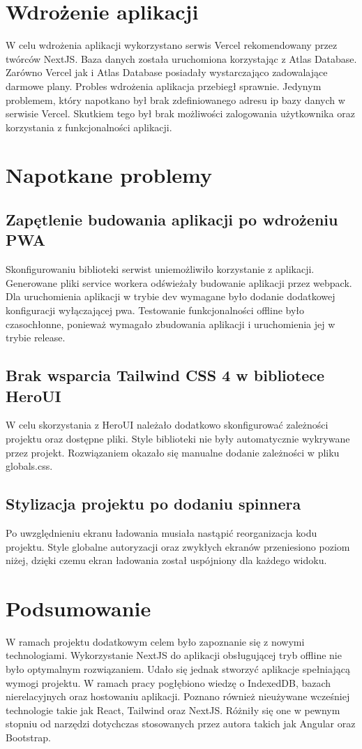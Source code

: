 \documentclass[11pt,titlepage]{article}
\begin{document}
\section{Wdrożenie aplikacji}
W celu wdrożenia aplikacji wykorzystano serwis Vercel rekomendowany przez twórców NextJS. Baza danych została uruchomiona korzystając z Atlas Database. Zarówno Vercel jak i Atlas Database posiadały wystarczająco zadowalające darmowe plany. Probles wdrożenia aplikacja przebiegł sprawnie. Jedynym problemem, który napotkano był brak zdefiniowanego adresu ip bazy danych w serwisie Vercel. Skutkiem tego był brak możliwości zalogowania użytkownika oraz korzystania z funkcjonalności aplikacji.

\section{Napotkane problemy}
\subsection{Zapętlenie budowania aplikacji po wdrożeniu PWA}
Skonfigurowaniu biblioteki serwist uniemożliwiło korzystanie z aplikacji. Generowane pliki service workera odświeżały budowanie aplikacji przez webpack. Dla uruchomienia aplikacji w trybie dev wymagane było dodanie dodatkowej konfiguracji wyłączającej pwa. Testowanie funkcjonalności offline było czasochłonne, ponieważ wymagało zbudowania aplikacji i uruchomienia jej w trybie release.

\subsection{Brak wsparcia Tailwind CSS 4 w bibliotece HeroUI}
W celu skorzystania z HeroUI należało dodatkowo skonfigurować zależności projektu oraz dostępne pliki. Style biblioteki nie były automatycznie wykrywane przez projekt. Rozwiązaniem okazało się manualne dodanie zależności w pliku globals.css.

\subsection{Stylizacja projektu po dodaniu spinnera}
Po uwzględnieniu ekranu ładowania musiała nastąpić reorganizacja kodu projektu. Style globalne autoryzacji oraz zwykłych ekranów przeniesiono poziom niżej, dzięki czemu ekran ładowania został uspójniony dla każdego widoku.

\section{Podsumowanie}
W ramach projektu dodatkowym celem było zapoznanie się z nowymi technologiami. Wykorzystanie NextJS do aplikacji obsługującej tryb offline nie było optymalnym rozwiązaniem. Udało się jednak stworzyć aplikacje spełniającą wymogi projektu. W ramach pracy pogłębiono wiedzę o IndexedDB, bazach nierelacyjnych oraz hostowaniu aplikacji. Poznano również nieużywane wcześniej technologie takie jak React, Tailwind oraz NextJS. Różniły się one w pewnym stopniu od narzędzi dotychczas stosowanych przez autora takich jak Angular oraz Bootstrap.
\end{document}
